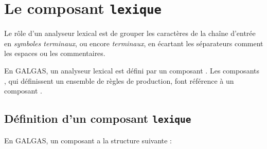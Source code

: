 
\chapter{Le composant \texttt{lexique}}

Le rôle d'un analyseur lexical est de grouper les caractères de la chaîne d'entrée en \emph{symboles terminaux}, ou encore \emph{terminaux}, en écartant les séparateurs comment les espaces ou les commentaires. 

En GALGAS, un analyseur lexical est défini par un composant . Les composants , qui définissent un ensemble de règles de production, font référence à un composant .



\section{Définition d'un composant \texttt{lexique}}


En GALGAS, un composant  a la structure suivante :

